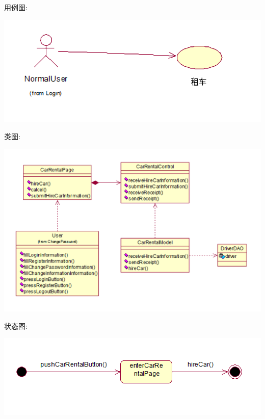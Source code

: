 \documentclass[11pt]{article}
\begin{document}
			用例图: 
			\begin{center}
			\includegraphics[scale=0.42]{租车服务_用例图.png}
			\end{center}

			类图: 
			\begin{center}
			\includegraphics[scale=0.42]{租车服务_类图.png}
			\end{center}

			状态图: 
			\begin{center}
			\includegraphics[scale=0.42]{租车服务_状态图.png}
			\end{center}
\end{document}

